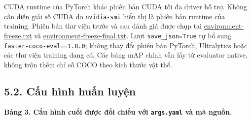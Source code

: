\documentclass[
  vietnamese,
  12pt,
  a4paper,
]{article}
\begin{document}
\endgroup

CUDA runtime của PyTorch khác phiên bản CUDA tối đa driver hỗ trợ. Không
cần diễn giải số CUDA do
\texttt{n\allowbreak{}v\allowbreak{}i\allowbreak{}d\allowbreak{}i\allowbreak{}a\allowbreak{}-\allowbreak{}s\allowbreak{}m\allowbreak{}i\allowbreak{}}
hiển thị là phiên bản runtime của training. Phiên bản thư viện trước và
sau đánh giá được chụp tại
\href{reports/evaluation/environment-freeze.txt}{environment-freeze.txt}
và
\href{reports/evaluation/environment-freeze-final.txt}{environment-freeze-final.txt}.
Lượt
\texttt{s\allowbreak{}a\allowbreak{}v\allowbreak{}e\allowbreak{}\_\allowbreak{}j\allowbreak{}s\allowbreak{}o\allowbreak{}n\allowbreak{}=\allowbreak{}T\allowbreak{}r\allowbreak{}u\allowbreak{}e\allowbreak{}}
tự bổ sung
\texttt{f\allowbreak{}a\allowbreak{}s\allowbreak{}t\allowbreak{}e\allowbreak{}r\allowbreak{}-\allowbreak{}c\allowbreak{}o\allowbreak{}c\allowbreak{}o\allowbreak{}-\allowbreak{}e\allowbreak{}v\allowbreak{}a\allowbreak{}l\allowbreak{}=\allowbreak{}=\allowbreak{}1\allowbreak{}.\allowbreak{}8\allowbreak{}.\allowbreak{}0\allowbreak{}};
không thay đổi phiên bản PyTorch, Ultralytics hoặc các thư viện training
đang có. Các bảng mAP chính vẫn lấy từ evaluator native, không trộn thêm
chỉ số COCO theo kích thước vật thể.

\subsection{5.2. Cấu hình huấn
luyện}\label{cux1ea5u-huxecnh-huux1ea5n-luyux1ec7n}

\textbf{Bảng 3. Cấu hình cuối được đối chiếu với
\texttt{a\allowbreak{}r\allowbreak{}g\allowbreak{}s\allowbreak{}.\allowbreak{}y\allowbreak{}a\allowbreak{}m\allowbreak{}l\allowbreak{}}
và mã nguồn.}

\begingroup\small\setlength{\tabcolsep}{4pt}\renewcommand{\arraystretch}{1.12}
\end{document}
